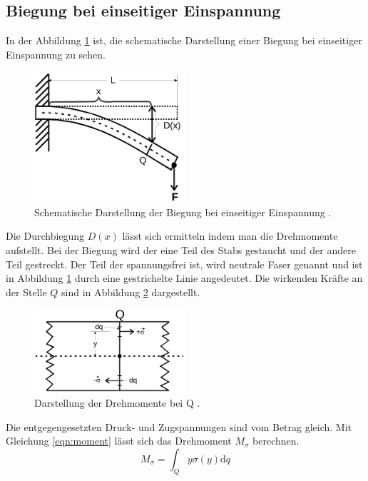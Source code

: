 \subsection{Biegung bei einseitiger Einspannung}
In der Abbildung \ref{fig:Einseitige_Einspannung} ist, die schematische Darstellung
einer Biegung bei einseitiger Einspannung zu sehen.
\begin{figure}[H]
  \centering
  \includegraphics[width=0.5\textwidth]{einseitige.png}
  \caption{Schematische Darstellung der Biegung bei einseitiger Einspannung \cite{sample}.}
  \label{fig:Einseitige_Einspannung}
\end{figure}
Die Durchbiegung $D(x)$ lässt sich ermitteln indem man die Drehmomente aufstellt.
Bei der Biegung wird der eine Teil des Stabs gestaucht und der andere Teil gestreckt.
Der Teil der spannungsfrei ist, wird neutrale Faser genannt und ist in Abbildung
\ref{fig:Einseitige_Einspannung} durch eine gestrichelte Linie angedeutet. Die
wirkenden Kräfte an der Stelle $Q$ sind in Abbildung \ref{fig:Drehmomente} dargestellt.
\begin{figure}[H]
  \centering
  \includegraphics[width=0.5\textwidth]{Drehmomente.png}
  \caption{Darstellung der Drehmomente bei Q \cite{sample}.}
  \label{fig:Drehmomente}
\end{figure}
Die entgegengesetzten Druck- und Zugspannungen sind vom Betrag gleich. Mit Gleichung
\eqref{eqn:moment} lässt sich das Drehmoment $M_\sigma$ berechnen.
\begin{equation}
  M_\sigma=\int_Q y\sigma(y)\text{d}q
  \label{eqn:moment}
\end{equation}
